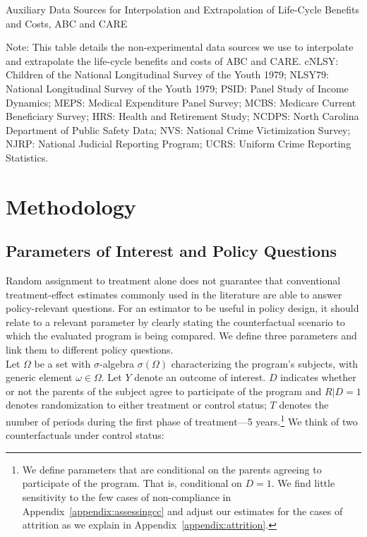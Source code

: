 \begin{table}[H]
\begin{threeparttable}
\caption{Auxiliary Data Sources for Interpolation and Extrapolation of Life-Cycle Benefits and Costs, ABC and CARE} \label{table:sources}
\footnotesize

\begin{tablenotes}
\footnotesize
Note: This table details the non-experimental data sources we use to interpolate and extrapolate the life-cycle benefits and costs of ABC and CARE. cNLSY: Children of the National Longitudinal Survey of the Youth 1979; NLSY79: National Longitudinal Survey of the Youth 1979; PSID: Panel Study of Income Dynamics; MEPS: Medical Expenditure Panel Survey; MCBS: Medicare Current Beneficiary Survey; HRS: Health and Retirement Study; NCDPS: North Carolina Department of Public Safety Data; NVS: National Crime Victimization Survey; NJRP: National Judicial Reporting Program; UCRS: Uniform Crime Reporting Statistics.
\end{tablenotes}
\end{threeparttable}
\end{table}

\section{Methodology} \label{section:methodology}

\subsection{Parameters of Interest and Policy Questions} \label{section:methodsquestions}

\noindent Random assignment to treatment alone does not guarantee that conventional treatment-effect estimates commonly used in the literature are able to answer policy-relevant questions. For an estimator to be useful in policy design, it should relate to a relevant parameter by clearly stating the counterfactual scenario to which the evaluated program is being compared. We define three parameters and link them to different policy questions.\\ 

\noindent Let $\Omega$ be a set with $\sigma$-algebra $\sigma \left( \Omega \right)$ characterizing the program's subjects, with generic element $\omega \in \Omega$. Let $Y$ denote an outcome of interest. $D$ indicates whether or not the parents of the subject agree to participate of the program and $R | D = 1$ denotes randomization to either treatment or control status; $T$ denotes the number of periods during the first phase of treatment---5 years.\footnote{We define parameters that are conditional on the parents agreeing to participate of the program. That is, conditional on $D = 1$. We find little sensitivity to the few cases of non-compliance in Appendix~\ref{appendix:assessingcc} and adjust our estimates for the cases of attrition as we explain in Appendix~\ref{appendix:attrition}.} We think of two counterfactuals under control status: 

